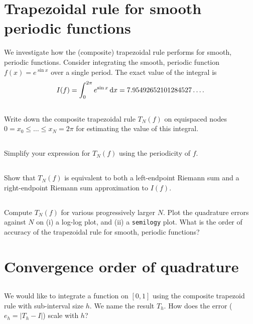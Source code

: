 \documentclass[11pt,letterpaper]{article}
\begin{document}
\section{Trapezoidal rule for smooth periodic functions}

We investigate how the (composite) trapezoidal rule performs for smooth, periodic functions. Consider integrating the smooth, periodic function $f(x) = e^{\sin x}$ over a single period. The exact value of the integral is
\[
I(f) = \int_0^{2\pi} e^{\sin x} \, \mathrm{d} x = 7.95492652101284527\dots.
\]

\subsection{}
Write down the composite trapezoidal rule $T_N(f)$ on equispaced nodes $0=x_0 \le  \dots \le x_N = 2\pi$ for estimating the value of this integral. 

\subsection{}
Simplify your expression for $T_N(f)$ using the periodicity of $f$.

\subsection{}
Show that $T_N(f)$ is equivalent to both a left-endpoint Riemann sum and a right-endpoint Riemann sum approximation to $I(f)$.

\subsection{}
Compute $T_N(f)$ for various progressively larger $N$. Plot the quadrature errors against $N$ on (i) a log-log plot, and (ii) a \texttt{semilogy} plot. What is the order of accuracy of the trapezoidal rule for smooth, periodic functions?

\section{Convergence order of quadrature}
\subsection{}
We would like to integrate a function on $[0,1]$ using the composite trapezoid rule with sub-interval size $h$. We name the result $T_h$. How does the error ($e_h = |T_h-I|$) scale with $h$?
\end{document}
